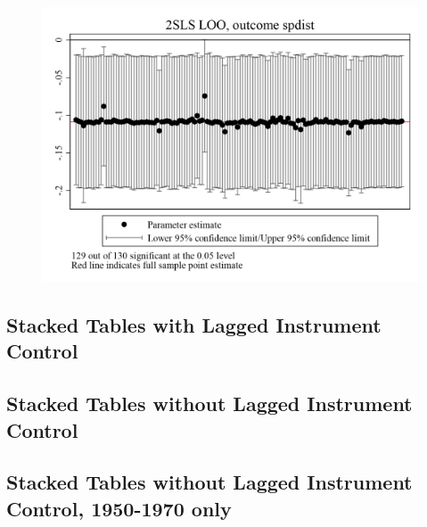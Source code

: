 \documentclass{article}
\begin{document}
\clearpage
\begin{figure}
	\centering
	\includegraphics[width=.8\textwidth]{figures/exogeneity_tests/loo_iv_spdist.png}
\end{figure}
\clearpage


\subsection{Stacked Tables with Lagged Instrument Control}


\clearpage


\clearpage

\subsection{Stacked Tables without Lagged Instrument Control}


\clearpage


\clearpage

\subsection{Stacked Tables without Lagged Instrument Control, 1950-1970 only}


\clearpage


\clearpage
\end{document}
